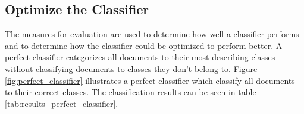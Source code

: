 \subsection{Optimize the Classifier}

The measures for evaluation are used to determine how well a classifier performs and to determine how the classifier could be optimized to perform better. A perfect classifier categorizes all documents to their most describing classes without classifying documents to classes they don't belong to. Figure \ref{fig:perfect_classifier} illustrates a perfect classifier which classify all documents to their correct classes. The classification results can be seen in table \ref{tab:results_perfect_classifier}.

